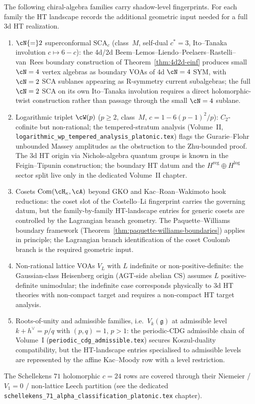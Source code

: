 \begin{remark}
\label{rem:ht-landscape-comparison-loci}
The following chiral-algebra families carry shadow-level fingerprints.
For each family the HT landscape records the additional geometric input
needed for a full 3d HT realization.
\begin{enumerate}[leftmargin=*]
\item $\cN{=}2$ superconformal $\mathrm{SCA}_c$ (class~$M$,
self-dual $c^{*}=3$, Ito--Tanaka involution $c\mapsto 6-c$): the
4d/2d Beem--Lemos--Liendo--Peelaers--Rastelli--van~Rees boundary
construction of Theorem~\ref{thm:4d2d-einf} produces small $\cN=4$
vertex algebras as boundary VOAs of 4d $\cN=4$ SYM, with
$\cN=2$ SCA sublanes appearing as R-symmetry current subalgebras;
the full $\cN=2$ SCA on its own Ito--Tanaka involution requires a
direct holomorphic-twist construction rather than passage through the
small $\cN=4$ sublane.
\item Logarithmic triplet $\cW(p)$ ($p\ge 2$, class~$M$,
$c = 1 - 6(p-1)^{2}/p$): $C_{2}$-cofinite but non-rational; the
tempered-stratum analysis (Volume~II,
\texttt{logarithmic\_wp\_tempered\_analysis\_platonic.tex})
flags the Gurarie--Flohr unbounded Massey amplitudes as the
obstruction to the Zhu-bounded proof. The 3d HT origin via
Nichols-algebra quantum groups is known in the Feigin--Tipunin
construction; the boundary
HT datum and the $H^{\mathrm{reg}}\oplus H^{\mathrm{log}}$ sector
split live only in the dedicated Volume~II chapter.
\item Cosets $\operatorname{Com}(\cH_{\kappa},\cA)$ beyond GKO and
Kac--Roan--Wakimoto hook reductions: the coset slot of the
Costello--Li fingerprint carries the governing datum, but the
family-by-family HT-landscape entries for generic cosets are
controlled by the Lagrangian branch geometry. The Paquette--Williams boundary framework
(Theorem~\ref{thm:paquette-williams-boundaries}) applies in
principle; the Lagrangian branch identification of the coset
Coulomb branch is the required geometric input.
\item Non-rational lattice VOAs $V_{L}$ with $L$ indefinite or
non-positive-definite: the Gaussian-class Heisenberg origin
(AGT-side abelian CS) assumes $L$ positive-definite unimodular;
the indefinite case corresponds physically to 3d HT theories with
non-compact target and requires a non-compact HT target analysis.
\item Roots-of-unity and admissible families, i.e.\
$V_{k}(\mathfrak{g})$ at admissible level
$k+h^{\vee}=p/q$ with $(p,q)=1$, $p>1$: the periodic-CDG
admissible chain of Volume~I
(\texttt{periodic\_cdg\_admissible.tex}) secures Koszul-duality
compatibility, but the HT-landscape entries specialised to
admissible levels are represented by
the affine Kac--Moody row with a level restriction.
\end{enumerate}
The Schellekens $71$ holomorphic $c=24$ rows are covered
through their Niemeier / $V_1=0$ / non-lattice Leech partition
(see the dedicated
\texttt{schellekens\_71\_alpha\_classification\_platonic.tex}
chapter).
\end{remark}

